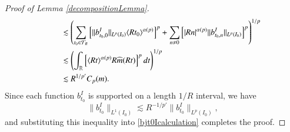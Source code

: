 \begin{proof} [Proof of Lemma \ref{decompositionLemma}]
\begin{align}
\begin{split}
        &\quad\quad \lesssim \left( \sum_{t_0 \in \mathcal{T}_R} \left[ \| b_{t_0,0}^I \|_{L^p(I_0)} \langle R t_0 \rangle^{\alpha(p)} \right]^p + \sum_{n \neq 0} \left[ |R n|^{\alpha(p)} \| b_{t_0,n}^I \|_{L^p(I_0)} \right]^p \right)^{1/p}\\
        &\quad\quad \lesssim \left( \int_{\operatorname{\mathbb{R}}} \left[ \langle R t \rangle^{\alpha(p)} R \widehat{m}(R t) \right]^p dt \right)^{1/p}\\
        &\quad\quad \lesssim R^{1/p'} C_p(m).
    \end{split}
    \end{align}
    Since each function $b_{t_0}^I$ is supported on a length $1/R$ interval, we have
    \begin{equation}
        \| b_{t_0}^I \|_{L^1(I_0)} \lesssim R^{-1/p'} \| b_{t_0}^I \|_{L^p(I_0)},
    \end{equation}
    and substituting this inequality into \eqref{bjt0Icalculation} completes the proof.
\end{proof}


